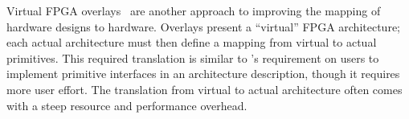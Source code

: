 
Virtual FPGA overlays~\cite{lysecky2005firm,brant2012zuma, landgraf2021compiler}
  are another approach to
  improving the mapping of hardware designs
  to hardware.
Overlays present a ``virtual''
  FPGA architecture;
  each actual architecture
  must then define a mapping
  from virtual to actual primitives.
This required translation is similar to
  \lr's requirement on users
  to implement primitive interfaces
  in an architecture description,
  though it requires more user effort.
The translation from virtual to actual architecture
  often comes with
  a steep resource
  and performance overhead.


  


